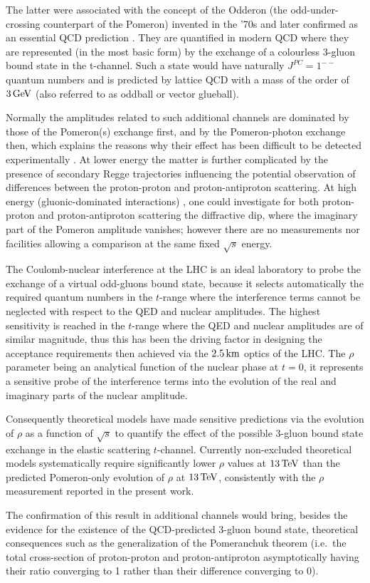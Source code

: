 The latter were associated with the concept of the Odderon (the odd-under-crossing counterpart of the Pomeron) invented in the '70s \cite{nicolescu-1973,nicolescu-1975} and later confirmed as an essential QCD prediction \cite{lipatov-1986}. They are quantified in modern QCD \cite{durham-2015-review} where they are represented (in the most basic form) by the exchange of a colourless 3-gluon bound state in the t-channel. Such a state would have naturally $J^{PC}=1^{--}$ quantum numbers and is predicted by lattice QCD with a mass of the order of $3\,{\rm GeV}$ (also referred to as oddball or vector glueball).

Normally the amplitudes related to such additional channels are dominated by those of the Pomeron(s) exchange first, and by the Pomeron-photon exchange then, which explains the reasons why their effect has been difficult to be detected experimentally . At lower energy  the matter is further complicated by the presence of secondary Regge trajectories influencing the potential observation of differences between the proton-proton and proton-antiproton scattering. At high energy (gluonic-dominated interactions) , one could investigate for both proton-proton and proton-antiproton scattering the diffractive dip, where the imaginary part of the Pomeron amplitude vanishes; however there are no measurements nor facilities allowing a comparison at the same fixed $\sqrt s$ energy.

The Coulomb-nuclear interference at the LHC is an ideal laboratory to probe the exchange of a virtual odd-gluons bound state, because it selects automatically the required quantum numbers in the $t$-range where the interference terms cannot be neglected with respect to the QED and nuclear amplitudes. The highest sensitivity is reached in the $t$-range where the QED and nuclear amplitudes are of similar magnitude, thus this has been the driving factor in designing the acceptance requirements then achieved via the $2.5\,{\rm km}$ optics of the LHC. The $\rho$ parameter being an analytical function of the nuclear phase at $t=0$, it represents a sensitive probe of the interference terms into the evolution of the real and imaginary parts of the nuclear amplitude.

Consequently theoretical models have made sensitive predictions via the evolution of $\rho$ as a function of $\sqrt s$ to quantify the effect of the possible 3-gluon bound state exchange in the elastic scattering $t$-channel. Currently non-excluded theoretical models systematically require significantly lower $\rho$ values at $13\,{\rm TeV}$ than the predicted Pomeron-only evolution of $\rho$ at $13\,{\rm TeV}$, consistently with the $\rho$ measurement reported in the present work.

The confirmation of this result in additional channels would bring, besides the evidence for the existence of the QCD-predicted 3-gluon bound state, theoretical consequences such as the generalization of the Pomeranchuk theorem (i.e.~the total cross-section of proton-proton and proton-antiproton asymptotically having their ratio converging to 1 rather than their difference converging to 0).
